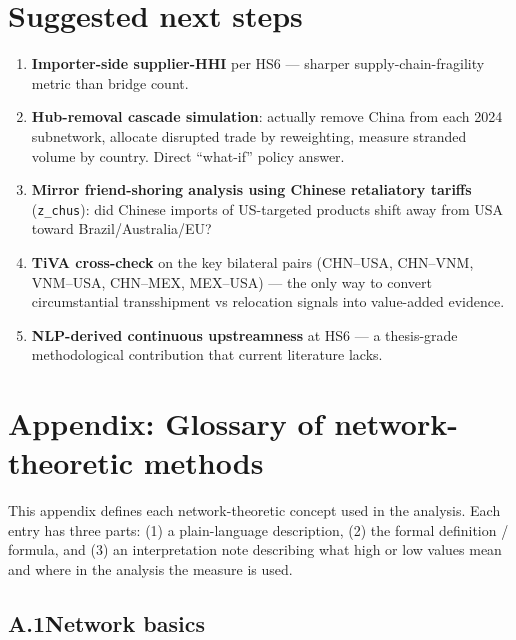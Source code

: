 \documentclass[11pt,a4paper]{article}
\begin{document}
\section{Suggested next steps}

\begin{enumerate}[leftmargin=*]
  \item \textbf{Importer-side supplier-HHI} per HS6 — sharper
        supply-chain-fragility metric than bridge count.
  \item \textbf{Hub-removal cascade simulation}: actually remove China
        from each 2024 subnetwork, allocate disrupted trade by reweighting,
        measure stranded volume by country. Direct ``what-if'' policy answer.
  \item \textbf{Mirror friend-shoring analysis using Chinese retaliatory
        tariffs} (\texttt{z\_chus}): did Chinese imports of US-targeted
        products shift away from USA toward Brazil/Australia/EU?
  \item \textbf{TiVA cross-check} on the key bilateral pairs
        (CHN--USA, CHN--VNM, VNM--USA, CHN--MEX, MEX--USA) — the only
        way to convert circumstantial transshipment vs relocation
        signals into value-added evidence.
  \item \textbf{NLP-derived continuous upstreamness} at HS6 — a
        thesis-grade methodological contribution that current literature
        lacks.
\end{enumerate}

\appendix
\section*{Appendix: Glossary of network-theoretic methods}

This appendix defines each network-theoretic concept used in the analysis.
Each entry has three parts: (1) a plain-language description, (2) the
formal definition / formula, and (3) an interpretation note describing what
high or low values mean and where in the analysis the measure is used.

\subsection*{A.1\quad Network basics}
\end{document}
